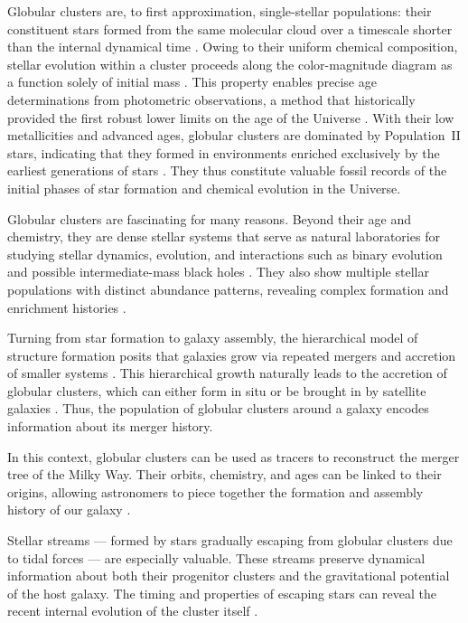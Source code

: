     Globular clusters are, to first approximation, single-stellar populations: their constituent stars formed from the same molecular cloud over a timescale shorter than the internal dynamical time \citep{1988ApJ...324..288A,2009MNRAS.397..954F,2014PhR...539...49K}. Owing to their uniform chemical composition, stellar evolution within a cluster proceeds along the color-magnitude diagram as a function solely of initial mass \citep{2013sse..book.....K}. This property enables precise age determinations from photometric observations, a method that historically provided the first robust lower limits on the age of the Universe \citep{1959MNRAS.119..124H,1985A&A...147..169G,1992ApJ...400..265M}. With their low metallicities and advanced ages, globular clusters are dominated by Population~II stars, indicating that they formed in environments enriched exclusively by the earliest generations of stars \citep{2022A&A...668A.191C}. They thus constitute valuable fossil records of the initial phases of star formation and chemical evolution in the Universe.

Globular clusters are fascinating for many reasons. Beyond their age and chemistry, they are dense stellar systems that serve as natural laboratories for studying stellar dynamics, evolution, and interactions such as binary evolution and possible intermediate-mass black holes \citep{2013MNRAS.432.2779B,2015MNRAS.454.3150G,2018ARA&A..56...83B}. They also show multiple stellar populations with distinct abundance patterns, revealing complex formation and enrichment histories \citep{2008MNRAS.391..825D,2012A&ARv..20...50G}.

Turning from star formation to galaxy assembly, the hierarchical model of structure formation posits that galaxies grow via repeated mergers and accretion of smaller systems \citep{2015ARA&A..53...51S}. This hierarchical growth naturally leads to the accretion of globular clusters, which can either form in situ or be brought in by satellite galaxies \citep{2020MNRAS.498.2472K,2023A&A...673A..86P,2024MNRAS.528.3198B,2025A&A...693A.155P}. Thus, the population of globular clusters around a galaxy encodes information about its merger history.

In this context, globular clusters can be used as tracers to reconstruct the merger tree of the Milky Way. Their orbits, chemistry, and ages can be linked to their origins, allowing astronomers to piece together the formation and assembly history of our galaxy \citep{2021ApJ...909L..26B}.

Stellar streams — formed by stars gradually escaping from globular clusters due to tidal forces — are especially valuable. These streams preserve dynamical information about both their progenitor clusters and the gravitational potential of the host galaxy. The timing and properties of escaping stars can reveal the recent internal evolution of the cluster itself \citep{1972ApJ...178..623T,1995AJ....109.2553G}. 


